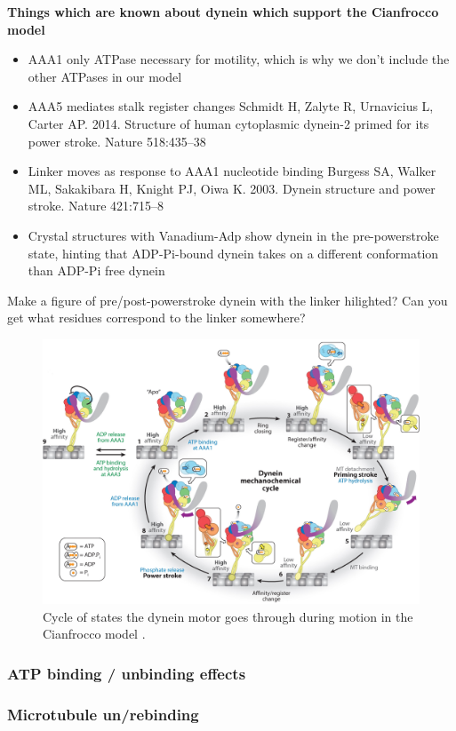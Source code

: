 \documentclass[10pt]{article} %
\begin{document}
\textbf{Things which are known about dynein which support the Cianfrocco model}
\begin{itemize}
\item AAA1 only ATPase necessary for motility, which is why we don't include the other ATPases in our model \cite{cianfroccoreview}
\item AAA5 mediates stalk register changes Schmidt H, Zalyte R, Urnavicius L, Carter AP. 2014. Structure of human cytoplasmic dynein-2 primed for
  its power stroke. Nature 518:435–38
\item Linker moves as response to AAA1 nucleotide binding Burgess SA, Walker ML, Sakakibara H, Knight PJ, Oiwa K. 2003. Dynein structure and power stroke. Nature
  421:715–8
\item Crystal structures with Vanadium-Adp show dynein in the pre-powerstroke state, hinting that ADP-Pi-bound dynein takes on a different conformation than ADP-Pi free dynein
\end{itemize}

Make a figure of pre/post-powerstroke dynein with the linker hilighted? Can you get what residues correspond to the linker somewhere?

\begin{figure}[h]
  \centering
  \includegraphics[width=.65\textwidth,keepaspectratio]{../figures/mechanochemical-cycle.jpeg}
  \caption{Cycle of states the dynein motor goes through during motion in the Cianfrocco model \cite{cianfroccoreview}.}
  \label{mech-cycle}
\end{figure}

\subsubsection{ATP binding / unbinding effects}
\subsubsection{Microtubule un/rebinding}
\end{document}
